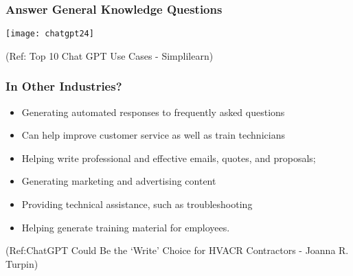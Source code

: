 \begin{frame}[fragile]\frametitle{Answer General Knowledge Questions}
\begin{center}
\texttt{[image: chatgpt24]}
\end{center}

{\tiny (Ref: Top 10 Chat GPT Use Cases - Simplilearn)}
\end{frame}

\begin{frame}[fragile]\frametitle{In Other Industries?}


\begin{itemize}
\item Generating automated responses to frequently asked questions 
\item Can help improve customer service as well as
train technicians
\item Helping write professional and effective emails, quotes, and proposals;
\item Generating marketing and advertising content
\item Providing technical assistance, such as troubleshooting
\item Helping generate training material for employees.
\end{itemize}	 

\tiny{(Ref:ChatGPT Could Be the ‘Write’ Choice for HVACR Contractors - Joanna R. Turpin)}
\end{frame}


